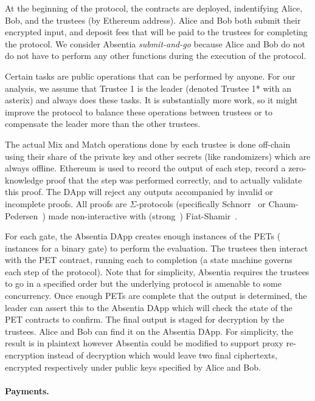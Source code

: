At the beginning of the protocol, the contracts are deployed, indentifying Alice, Bob, and the trustees (by Ethereum address). Alice and Bob both submit their encrypted input, and deposit fees that will be paid to the trustees for completing the protocol. We consider Absentia \emph{submit-and-go} because Alice and Bob do not do not have to perform any other functions during the execution of the protocol. 
 
Certain tasks are public operations that can be performed by anyone. For our analysis, we assume that Trustee 1 is the leader (denoted Trustee 1* with an asterix) and always does these tasks. It is substantially more work, so it might improve the protocol to balance these operations between trustees or to compensate the leader more than the other trustees.

The actual Mix and Match operations done by each trustee is done off-chain using their share of the private key and other secrets (like randomizers) which are always offline. Ethereum is used to record the output of each step, record a zero-knowledge proof that the step was performed correctly, and to actually validate this proof. The DApp will reject any outputs accompanied by invalid or incomplete proofs. All proofs are $\Sigma$-protocols (specifically Schnorr~\cite{Sch91} or Chaum-Pedersen~\cite{CP92}) made non-interactive with (strong~\cite{BPW12}) Fiat-Shamir~\cite{FS86}. 
 
For each gate, the Absentia DApp creates enough instances of the PETs ( instances for a binary gate) to perform the evaluation. The trustees then interact with the PET contract, running each to completion (a state machine governs each step of the protocol). Note that for simplicity, Absentia requires the trustees to go in a specified order but the underlying protocol is amenable to some concurrency. Once enough PETs are complete that the output is determined, the leader can assert this to the Absentia DApp which will check the state of the PET contracts to confirm. The final output is staged for decryption by the trustees. Alice and Bob can find it on the Absentia DApp. For simplicity, the result is in plaintext however Absentia could be modified to support proxy re-encryption instead of decryption which would leave two final ciphertexts,  encrypted respectively under public keys specified by Alice and Bob. 


\paragraph{Payments.}

